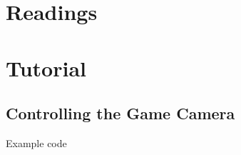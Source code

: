 \documentclass[
  openany]{book}
\begin{document}
\hypertarget{readings-6}{%
\section*{Readings}\label{readings-6}}

\hypertarget{tutorial-6}{%
\section*{Tutorial}\label{tutorial-6}}

\hypertarget{controlling-the-game-camera}{%
\subsection*{Controlling the Game Camera}\label{controlling-the-game-camera}}

Example code
\end{document}
